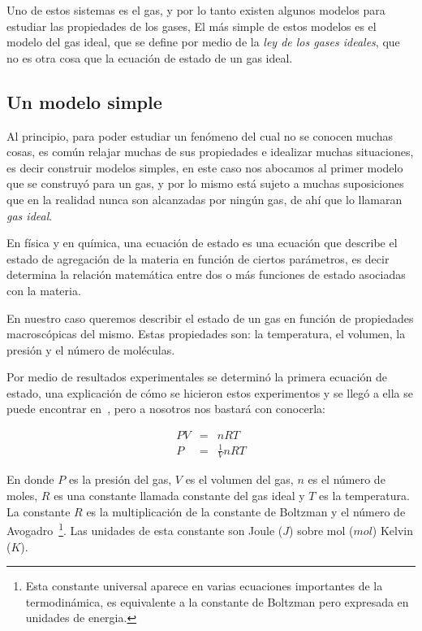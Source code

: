 Uno de estos sistemas es el gas, y por lo tanto existen algunos modelos para estudiar las propiedades de los gases, El más simple de estos modelos es el modelo del gas ideal, que se define por medio de la \emph{ley de los gases ideales}, que no es otra cosa que la ecuación de estado de un gas ideal.

\subsection{Un modelo simple}

Al principio, para poder estudiar un fenómeno del cual no se conocen muchas cosas, es común relajar muchas de sus propiedades e idealizar muchas situaciones, es decir construir modelos simples, en este caso nos abocamos al primer modelo que se construyó para un gas, y por lo mismo está sujeto a muchas suposiciones que en la realidad nunca son alcanzadas por ningún gas, de ahí que lo llamaran \emph{gas ideal}.

En física y en química, una ecuación de estado es una ecuación que describe el estado de agregación de la materia en función de ciertos parámetros, es decir determina la relación matemática entre dos o más funciones de estado asociadas con la materia.

En nuestro caso queremos describir el estado de un gas en función de propiedades macroscópicas del mismo. Estas propiedades son: la temperatura, el volumen, la presión y el número de moléculas.

Por medio de resultados experimentales se determinó la primera ecuación de estado, una explicación de cómo se hicieron estos experimentos y se llegó a ella se puede encontrar en~\cite{Resnick:Fisica}, pero a nosotros nos bastará con conocerla:

\begin{eqnarray}
PV & = & nRT \nonumber \\
P & = & \frac{1}{V}nRT
\end{eqnarray}

En donde $P$ es la presión del gas, $V$ es el volumen del gas, $n$ es el número de moles, $R$ es una constante llamada constante del gas ideal y $T$ es la temperatura. La constante $R$ es la multiplicación de la constante de Boltzman y el número de Avogadro~\footnote{Esta constante universal aparece en varias ecuaciones importantes de la termodinámica, es equivalente a la constante de Boltzman pero expresada en unidades de energia.}. Las unidades de esta constante son Joule ($J$) sobre mol ($mol$) Kelvin ($K$).

